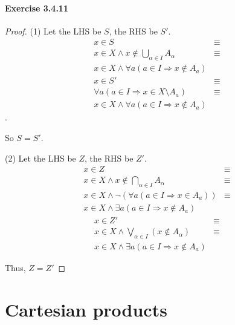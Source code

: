 \paragraph{Exercise 3.4.11} \label{exercise3.4.11}
\begin{proof}
(1) Let the LHS be $S$, the RHS be $S'$. 
\begin{align*}
x \in S &\equiv \\
x \in X \wedge x \notin \bigcup_{\alpha \in I} A_{\alpha} &\equiv \\
x \in X \wedge \forall a(a \in I \Longrightarrow x \notin A_{a})
\end{align*}
\begin{align*}
x \in S' &\equiv \\
\forall a(a \in I \Longrightarrow x \in X \setminus A_a) &\equiv \\
x \in X \wedge \forall a(a \in I \Longrightarrow x \notin A_a)
\end{align*}.

So $S=S'$.

(2) Let the LHS be $Z$, the RHS be $Z'$. 
\begin{align*}
x \in Z &\equiv \\
x \in X \wedge x \notin \bigcap_{\alpha \in I} A_{\alpha} &\equiv \\
x \in X \wedge \neg(\forall a(a \in I \Longrightarrow x \in A_a)) &\equiv \\
x \in X \wedge \exists a(a \in I \Longrightarrow x \notin A_a)
\end{align*}
\begin{align*}
x \in Z' &\equiv \\
x \in X \wedge \bigvee_{\alpha \in I}(x \notin A_{\alpha}) &\equiv \\
x \in X \wedge \exists a(a \in I \Longrightarrow x \notin A_a)
\end{align*}

Thus, $Z = Z'$
\end{proof}

\section{Cartesian products}
